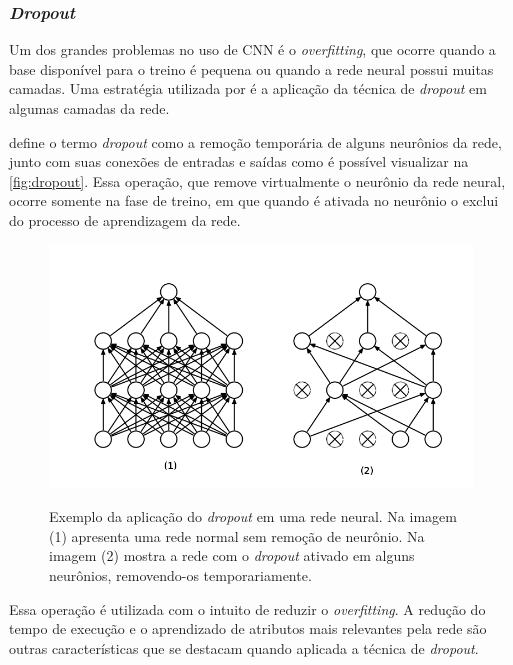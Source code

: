 \subsubsection{\textit{Dropout}}
Um dos grandes problemas no uso de CNN é o \textit{overfitting}, que ocorre quando a base disponível para o treino é pequena ou quando a rede neural possui muitas camadas. Uma estratégia utilizada por  é a aplicação da técnica de \textit{dropout} em algumas camadas da rede.
\par {} define o termo \textit{dropout} como a remoção temporária de alguns neurônios da rede, junto com suas conexões de entradas e saídas como é possível visualizar na \autoref{fig:dropout}. Essa operação, que remove virtualmente o neurônio da rede neural, ocorre somente na fase de treino, em que quando é ativada no neurônio o exclui do processo de aprendizagem da rede. 
\begin{figure}[H]
  \centering
  \caption{Exemplo da aplicação do \textit{dropout} em uma rede neural. Na imagem (1) apresenta uma rede normal sem remoção de neurônio. Na imagem (2) mostra a rede com o \textit{dropout} ativado em alguns neurônios, removendo-os temporariamente.}
  \includegraphics[width=400pt]{dados/figuras/dropout}
  \label{fig:dropout}
\end{figure} 
\par Essa operação é utilizada com o intuito de reduzir o \textit{overfitting}. A redução do tempo de execução e o aprendizado de atributos mais relevantes pela rede são outras características que se destacam quando aplicada a técnica de \textit{dropout}.


